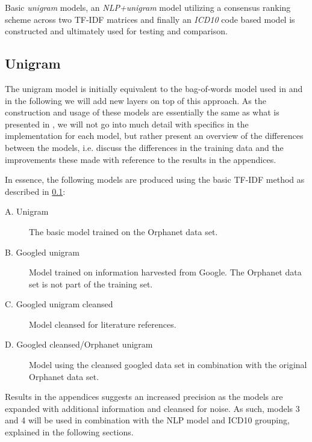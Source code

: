 \documentclass[10pt,letterpaper,two column,final]{article}
\begin{document}
Basic \textit{unigram} models, an \textit{NLP+unigram} model utilizing a
consensus ranking scheme across two TF-IDF matrices and finally an
\textit{ICD10} code based model is constructed and ultimately used for
testing and comparison.


\subsection{Unigram}
\label{chap:unigrammethod}
The unigram model is initially equivalent to the bag-of-words model used in
\cite{jensenandersen} and in the following we will add new layers on top of this
approach. As the construction and usage of these models are essentially
the same as what is presented in \cite{jensenandersen}, we will not go
into much detail with specifics in the implementation for each model,
but rather present an overview of the differences between the models,
i.e. discuss the differences in the training data and the improvements
these made with reference to the results in the appendices.

In essence, the following models are produced using the basic TF-IDF
method as described in \ref{chap:unigrammethod}:

\begin{description}
\item[A. Unigram] The basic model trained on the Orphanet data set.
\item[B. Googled unigram] Model trained on information harvested from
Google. The Orphanet data set is not part of the training set.
\item[C. Googled unigram cleansed] Model cleansed for literature
references.
\item[D. Googled cleansed/Orphanet unigram] Model using the cleansed
googled data set in combination with the original Orphanet data set.
\end{description}

Results in the appendices suggests an increased precision as the models
are expanded with additional information and cleansed for noise. As such, models 3
and 4 will be used in combination with the NLP model and ICD10 grouping,
explained in the following sections.
\end{document}
